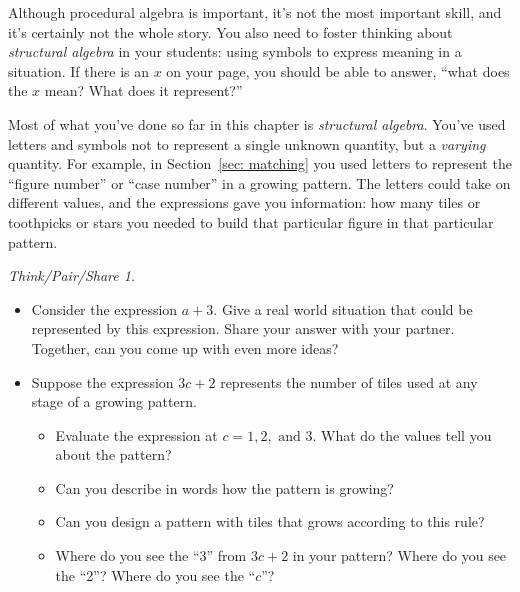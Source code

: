 \documentclass[12pt, reqno]{amsart}
\theoremstyle{remark}
\newtheorem*{thinkpair*}{Think/Pair/Share}
\theoremstyle{definition}
\numberwithin{equation}{section}  %
\begin{document}
\bigskip

Although procedural algebra is important, it's not the most important skill, and it's certainly not the whole story.
You also need to foster thinking about  \emph{structural algebra} in your students: using symbols to express meaning in a situation.  If there is an $x$ on your page, you should be able to answer, ``what does the $x$ mean?  What does it represent?''  

Most of what you've done so far in this chapter is \emph{structural algebra}.  You've used letters and symbols not to represent a single unknown quantity, but a \emph{varying} quantity.  For example, in Section~\ref{sec: matching} you used letters to represent the ``figure number'' or ``case number'' in a growing pattern.  The letters could take on different values, and the expressions gave you information: how many tiles or toothpicks or stars you needed to build that particular figure in that particular pattern.

\newpage

\begin{thinkpair*}\ 
\begin{itemize}
\item
Consider the expression $a + 3$.  Give a real world situation that could be represented by this expression.  Share your answer with your partner.  Together, can you come up with even more ideas?\\
\item
Suppose the expression $3c+2$ represents the number of tiles used at any stage of a growing pattern. 
\begin{itemize}
\item
 Evaluate the expression at $c = 1, 2, \text{ and } 3$.  What do the values tell you about the pattern?  \\
 \item
 Can you describe in words how the pattern is growing?  \\
 \item
 Can you design a pattern with tiles that grows according to this rule?\\
 \item
 Where do you see the ``3'' from $3c+2$ in your pattern?  Where do you see the ``2''?  Where do you see the ``$c$''?
\end{itemize}
\end{itemize}
\end{thinkpair*}


\newpage
\end{document}
